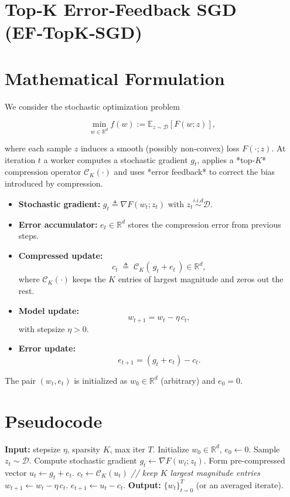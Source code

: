 \documentclass{article}
\newcommand{\E}{\mathbb{E}}
\newcommand{\R}{\mathbb{R}}
\newcommand{\grad}{\nabla}
\newcommand{\topk}[1]{\mathcal{C}_{K}(#1)}
\begin{document}
\section*{Top‑K Error‑Feedback SGD (EF‑TopK‑SGD)}

\section*{Mathematical Formulation}
We consider the stochastic optimization problem  

\[
\min_{w\in\R^{d}} f(w):=\E_{z\sim\mathcal{D}}[F(w;z)],
\]

where each sample $z$ induces a smooth (possibly non‑convex) loss $F(\cdot;z)$.  
At iteration $t$ a worker computes a stochastic gradient $g_t$,
applies a *top‑$K$* compression operator $\topk{\cdot}$ and uses *error feedback* to correct the bias introduced by compression.

\begin{itemize}
\item \textbf{Stochastic gradient:} $g_t \triangleq \grad F(w_t;z_t)$ with $z_t\stackrel{i.i.d}{\sim}\mathcal D$.
\item \textbf{Error accumulator:} $e_t\in\R^{d}$ stores the compression error from previous steps.
\item \textbf{Compressed update:}
\[
c_t \;\triangleq\; \topk{\,g_t+e_t\,}\in\R^{d},
\]
where $\topk{\cdot}$ keeps the $K$ entries of largest magnitude and zeros out the rest.
\item \textbf{Model update:}
\[
w_{t+1}=w_t-\eta\,c_t,
\tag{1}
\]
with stepsize $\eta>0$.
\item \textbf{Error update:}
\[
e_{t+1}= (g_t+e_t)-c_t .
\tag{2}
\]
\end{itemize}

The pair $(w_t,e_t)$ is initialized as $w_0\in\R^{d}$ (arbitrary) and $e_0=0$.

\section*{Pseudocode}
\begin{algorithm}[H]
\caption{EF‑TopK‑SGD}
\begin{algorithmic}[1]
\STATE \textbf{Input:} stepsize $\eta$, sparsity $K$, max iter $T$.
\STATE Initialize $w_0\in\R^{d}$, $e_0\gets 0$.
    \STATE Sample $z_t\sim\mathcal D$.
    \STATE Compute stochastic gradient $g_t\gets\grad F(w_t;z_t)$.
    \STATE Form pre‑compressed vector $u_t\gets g_t+e_t$.
    \STATE $c_t\gets \topk{u_t}$   \hfill\textit{// keep $K$ largest magnitude entries}
    \STATE $w_{t+1}\gets w_t-\eta\,c_t$.
    \STATE $e_{t+1}\gets u_t-c_t$.
\ENDFOR
\STATE \textbf{Output:} $\{w_t\}_{t=0}^{T}$ (or an averaged iterate).
\end{algorithmic}
\end{algorithm}
\end{document}
